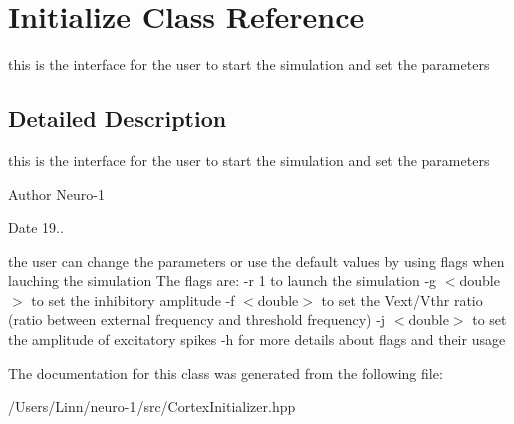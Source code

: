 \hypertarget{class_initialize}{}\section{Initialize Class Reference}
\label{class_initialize}


this is the interface for the user to start the simulation and set the parameters  




\subsection{Detailed Description}
this is the interface for the user to start the simulation and set the parameters 

\begin{DoxyAuthor}{Author}
Neuro-\/1
\end{DoxyAuthor}
\begin{DoxyDate}{Date}
19..
\end{DoxyDate}

\begin{DoxyItemize}
\item 
\end{DoxyItemize}

the user can change the parameters or use the default values by using flags when lauching the simulation The flags are\+: -\/r 1 to launch the simulation -\/g $<$double$>$ to set the inhibitory amplitude -\/f $<$double$>$ to set the Vext/\+Vthr ratio (ratio between external frequency and threshold frequency) -\/j $<$double$>$ to set the amplitude of excitatory spikes -\/h for more details about flags and their usage 

The documentation for this class was generated from the following file\+:\begin{DoxyCompactItemize}
\item 
/\+Users/\+Linn/neuro-\/1/src/Cortex\+Initializer.\+hpp\end{DoxyCompactItemize}
